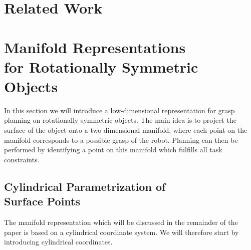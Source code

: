 \documentclass{aamas2015}
\begin{document}
%	
%	
\section{Related Work}

\section{Manifold Representations \\for Rotationally Symmetric \\Objects}
In this section we will introduce a low-dimensional representation for grasp 
planning on rotationally symmetric objects. The main idea is to project
the surface of the object onto a two-dimensional manifold, where each
point on the manifold corresponds to a possible grasp of the robot. Planning
can then be performed by identifying a point on this manifold which fulfills
all task constraints.

\subsection{Cylindrical Parametrization of \\Surface Points}
The manifold representation which will be discussed in the remainder of the paper is based
on a cylindrical coordinate system. We will therefore start by introducing cylindrical
coordinates. 
\end{document}

